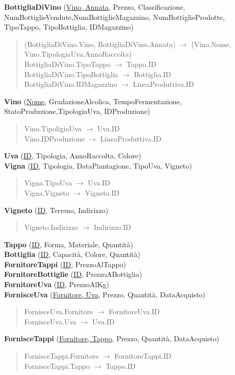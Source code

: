 \textbf{BottigliaDiVino} (\underline{Vino, Annata}, Prezzo, Classificazione, NumBottiglieVendute,NumBottiglieMagazzino, NumBottiglieProdotte, TipoTappo, TipoBottiglia, IDMagazzino)
\begin{verse}
	(BottigliaDiVino.Vino, BottigliaDiVino.Annata) $\to$ (Vino.Nome, Vino.TipologiaUva.AnnoRaccolta)\\
	BottigliaDiVino.TipoTappo $\to$ Tappo.ID\\
	BottigliaDiVino.TipoBottiglia $\to$ Bottiglia.ID\\
	BottigliaDiVino.IDMagazzino $\to$ LineaProduttiva.ID
\end{verse} 
\textbf{Vino} (\underline{Nome}, GradazioneAlcolica, TempoFermentazione, StatoProduzione,TipologiaUva, IDProduzione)
\begin{verse}
	Vino.TipoligiaUva $\to$ Uva.ID\\
	Vino.IDProduzione $\to$ LineaProduttiva.ID
\end{verse} 
\textbf{Uva} (\underline{ID}, Tipologia, AnnoRaccolta, Colore)\\
\textbf{Vigna} (\underline{ID}, Tipologia, DataPiantagione, TipoUva, Vigneto)
\begin{verse}
	Vigna.TipoUva $\to$ Uva.ID\\
	Vigna.Vigneto $\to$ Vigneto.ID
\end{verse} 
\textbf{Vigneto} (\underline{ID}, Terreno, Indirizzo)
\begin{verse}
	Vigneto.Indirizzo $\to$ Indirizzo.ID
\end{verse} 
\textbf{Tappo} (\underline{ID}, Forma, Materiale, Quantità)\\
\textbf{Bottiglia} (\underline{ID}, Capacità, Colore, Quantità)\\
\textbf{FornitoreTappi} (\underline{ID}, PrezzoAlTappo)\\
\textbf{FornitoreBottiglie} (\underline{ID}, PrezzoABottiglia)\\
\textbf{FornitoreUva} (\underline{ID}, PrezzoAlKg)\\
\textbf{FornisceUva} (\underline{Fornitore, Uva}, Prezzo, Quantità, DataAcquisto)
\begin{verse}
	FornisceUva.Fornitore $\to$ FornitoreUva.ID\\
	FornisceUva.Uva $\to$ Uva.ID
\end{verse}
\textbf{FornisceTappi} (\underline{Fornitore, Tappo}, Prezzo, Quantità, DataAcquisto)
\begin{verse}
	FornisceTappi.Fornitore $\to$ FornitoreTappi.ID\\
	FornisceTappi.Tappo $\to$ Tappo.ID
\end{verse} 
